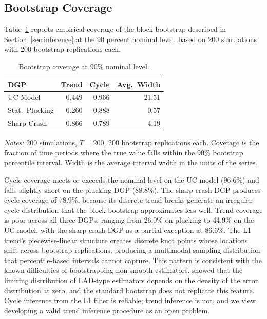 \documentclass[10pt]{article}
\begin{document}
\subsection{Bootstrap Coverage}
\label{app:bootstrap_coverage}

Table~\ref{tab:bootstrap_coverage} reports empirical coverage of the block bootstrap described in Section~\ref{sec:inference} at the 90 percent nominal level, based on 200 simulations with 200 bootstrap replications each.

\begin{table}[htbp]
\centering
\caption{Bootstrap coverage at 90\% nominal level.}
\label{tab:bootstrap_coverage}
\begin{tabular}{l rr r}
\toprule
DGP & Trend & Cycle & Avg.\ Width \\
\midrule
UC Model        & 0.449 & 0.966 & 21.51 \\
Stat.\ Plucking & 0.260 & 0.888 &  0.57 \\
Sharp Crash     & 0.866 & 0.789 &  4.19 \\
\bottomrule
\end{tabular}
\begin{tablenotes}
\small
\item \textit{Notes:} 200 simulations, $T = 200$, 200 bootstrap replications each. Coverage is the fraction of time periods where the true value falls within the 90\% bootstrap percentile interval. Width is the average interval width in the units of the series.
\end{tablenotes}
\end{table}

Cycle coverage meets or exceeds the nominal level on the UC model (96.6\%) and falls slightly short on the plucking DGP (88.8\%). The sharp crash DGP produces cycle coverage of 78.9\%, because its discrete trend breaks generate an irregular cycle distribution that the block bootstrap approximates less well. Trend coverage is poor across all three DGPs, ranging from 26.0\% on plucking to 44.9\% on the UC model, with the sharp crash DGP as a partial exception at 86.6\%. The L1 trend's piecewise-linear structure creates discrete knot points whose locations shift across bootstrap replications, producing a multimodal sampling distribution that percentile-based intervals cannot capture. This pattern is consistent with the known difficulties of bootstrapping non-smooth estimators. \citet{knight1998} showed that the limiting distribution of LAD-type estimators depends on the density of the error distribution at zero, and the standard bootstrap does not replicate this feature. Cycle inference from the L1 filter is reliable; trend inference is not, and we view developing a valid trend inference procedure as an open problem.
\end{document}
